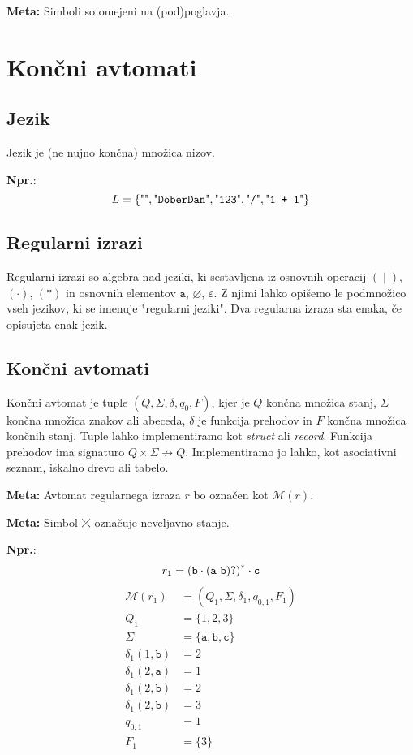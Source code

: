 \documentclass{report}
\newcommand{\Ex}{\textbf{Npr.}:\ }
\newcommand{\Special}[1]{\textbf{#1}}
\newcommand{\Empty}{\varnothing}
\newcommand{\Null}{\varepsilon}
\newcommand{\Alphabet}{\Sigma}
\newcommand{\Automaton}[1]{\mathcal{M}(#1)}
\newcommand{\Str}[1]{\text{\textquotedbl\texttt{#1}\textquotedbl}}
\newcommand{\Char}[1]{\texttt{#1}}
\newcommand{\Seq}{\cdot}
\newcommand{\Spc}{\ }
\newcommand{\Union}{\mathrel{|}}
\newcommand{\Kleene}[1]{{#1}^\ast}
\newcommand{\Err}{\rdiagovfdiag}
\begin{document}
\Special{Meta:} Simboli so omejeni na (pod)poglavja.

\chapter{Končni avtomati}

\section{Jezik}
Jezik je (ne nujno končna) množica nizov.

\Ex
\begin{equation*}
  L = \{\Str{}, \Str{DoberDan}, \Str{123}, \Str{/}, \Str{1 + 1} \}
\end{equation*}

\section{Regularni izrazi}
Regularni izrazi so algebra nad jeziki, ki sestavljena iz osnovnih operacij $(\Union)$, $(\Seq)$, $(\ast)$ in osnovnih elementov $\Char{a}$, $\Empty$, $\Null$.
Z njimi lahko opišemo le podmnožico vseh jezikov, ki se imenuje "regularni jeziki".
Dva regularna izraza sta enaka, če opisujeta enak jezik.

\section{Končni avtomati}

Končni avtomat je tuple $(Q, \Alphabet, \delta, q_0, F)$, kjer je $Q$ končna množica stanj, $\Sigma$ končna množica znakov ali abeceda, $\delta$ je funkcija prehodov in $F$ končna množica končnih stanj.
Tuple lahko implementiramo kot \emph{struct} ali \emph{record}.
Funkcija prehodov ima signaturo $Q \times \Sigma \not\rightarrow Q$.
Implementiramo jo lahko, kot asociativni seznam, iskalno drevo ali tabelo.

\Special{Meta:} Avtomat regularnega izraza $r$ bo označen kot $\Automaton{r}$.

\Special{Meta:} Simbol $\Err$ označuje neveljavno stanje.

\Ex
\begin{equation}
  r_1 = \Kleene{(\Char{b} \Seq (\Char{a} \Spc \Char{b})?)} \Seq \Char{c} \\
\end{equation}
\begin{align*}
  \Automaton{r_1} &= (Q_1, \Sigma, \delta_1, q_{0, 1}, F_1)\\[1em]
  Q_1 &= \{1, 2, 3\} \\[1em]
  \Sigma &= \{\Char{a}, \Char{b}, \Char{c}\} \\[1em]
  \delta_1(1, \Char{b}) & =  2\\
  \delta_1(2, \Char{a}) & =  1\\
  \delta_1(2, \Char{b}) & =  2\\
  \delta_1(2, \Char{b}) & =  3\\[1em]
  q_{0, 1} &= 1 \\[1em]
  F_1 &= \{3\}
\end{align*}
\end{document}
